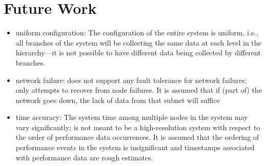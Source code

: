 \chapter{Future Work}
\label{future_work}

\begin{itemize}

\item uniform configuration: The configuration of the entire system is uniform, i.e., all branches of the system will be
collecting the same data at each level in the hierarchy---it is not possible to have different data being collected by
different branches.

\item network failure: \dcamp does not support any fault tolerance for network failures; \dcamp only attempts to recover
from node failures. It is assumed that if (part of) the network goes down, the lack of data from that subnet will
suffice

\item time accuracy: The system time among multiple nodes in the system may vary significantly; \dcamp is not meant to
be a high-resolution system with respect to the order of performance data occurrences. It is assumed that the ordering
of performance events in the system is insignificant and timestamps associated with performance data are rough
estimates.

\end{itemize}

